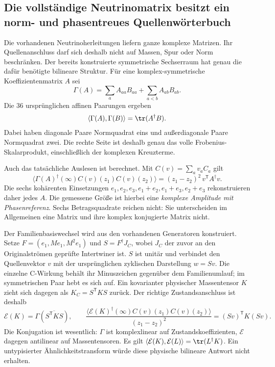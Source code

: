 \subsection{Die vollständige Neutrinomatrix besitzt ein norm- und phasentreues Quellenwörterbuch}\label{sec:neutrinodictionary}
Die vorhandenen Neutrinoherleitungen liefern ganze komplexe Matrizen.
Ihr Quellenanschluss darf sich deshalb nicht auf Massen, Spur oder Norm
beschränken. Der bereits konstruierte symmetrische Sechserraum hat genau
die dafür benötigte bilineare Struktur. Für eine komplex-symmetrische
Koeffizientenmatrix $A$ sei
\begin{equation}
 \Gamma(A)=\sum_a A_{aa}B_{aa}+\sum_{a<b}A_{ab}B_{ab}.
\end{equation}
Die 36 ursprünglichen affinen Paarungen ergeben
\begin{equation}\label{eq:pairisometry}
 \langle\Gamma(A),\Gamma(B)\rangle=\tr(A^\dagger B).
\end{equation}
Dabei haben diagonale Paare Normquadrat eins und außerdiagonale Paare
Normquadrat zwei. Die rechte Seite ist deshalb genau das volle
Frobenius-Skalarprodukt, einschließlich der komplexen Kreuzterme.

Auch das tatsächliche Auslesen ist berechnet. Mit $C(v)=\sum_a v_a C_a$ gilt
\begin{equation}\label{eq:pairtomography}
 \langle\Gamma(A)^\dagger(\infty)C(v)(z_1)C(v)(z_2)\rangle
 =(z_1-z_2)^2\,v^{\mathsf T}A^\dagger v.
\end{equation}
Die sechs kohärenten Einsetzungen
$e_1,e_2,e_3,e_1+e_2,e_1+e_3,e_2+e_3$ rekonstruieren daher jedes $A$.
Die gemessene Größe ist hierbei eine \emph{komplexe Amplitude mit Phasenreferenz}.
Sechs Betragsquadrate reichen nicht: Sie unterscheiden im Allgemeinen eine
Matrix und ihre komplex konjugierte Matrix nicht.

Der Familienbasiswechsel wird aus den vorhandenen Generatoren konstruiert.
Setze $F=(e_1,Me_1,M^2e_1)$ und $S=F^\dagger J_C$, wobei $J_C$ der zuvor
an den Originalströmen geprüfte Intertwiner ist. $S$ ist unitär und verbindet
den Quellenvektor $v$ mit der ursprünglichen zyklischen Darstellung $w=Sv$.
Die einzelne C-Wirkung behält ihr Minuszeichen gegenüber dem Familienumlauf;
im symmetrischen Paar hebt es sich auf. Ein kovarianter physischer
Massentensor $K$ zieht sich dagegen als $K_C=S^{\mathsf T}KS$ zurück.
Der richtige Zustandsanschluss ist deshalb
\begin{equation}\label{eq:massformencoding}
 \mathcal E(K)=\Gamma\!\left(\overline{S^{\mathsf T}KS}\right),\qquad
 \frac{\langle\mathcal E(K)^\dagger(\infty)C(v)(z_1)C(v)(z_2)\rangle}
 {(z_1-z_2)^2}=(Sv)^{\mathsf T}K(Sv).
\end{equation}
Die Konjugation ist wesentlich: $\Gamma$ ist komplexlinear auf
Zustandskoeffizienten, $\mathcal E$ dagegen antilinear auf Massentensoren.
Es gilt $\langle\mathcal E(K),\mathcal E(L)\rangle=\tr(L^\dagger K)$.
Ein untypisierter Ähnlichkeitstransform würde diese physische bilineare
Antwort nicht erhalten.

